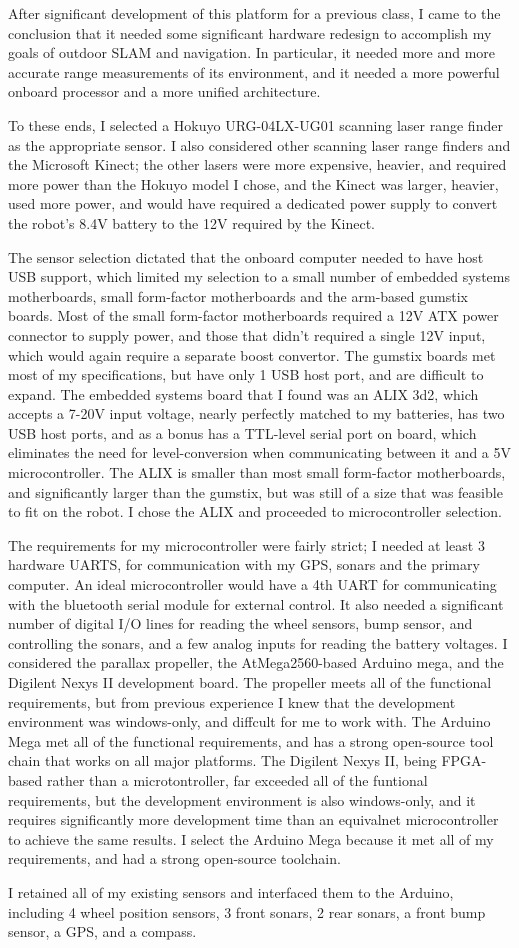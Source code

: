 
After significant development of this platform for a previous class, I came to the conclusion that it needed some significant hardware redesign to accomplish my goals of outdoor SLAM and navigation. In particular, it needed more and more accurate range measurements of its environment, and it needed a more powerful onboard processor and a more unified architecture.

To these ends, I selected a Hokuyo URG-04LX-UG01 scanning laser range finder as the appropriate sensor. I also considered other scanning laser range finders and the Microsoft Kinect; the other lasers were more expensive, heavier, and required more power than the Hokuyo model I chose, and the Kinect was larger, heavier, used more power, and would have required a dedicated power supply to convert the robot's 8.4V battery to the 12V required by the Kinect.

The sensor selection dictated that the onboard computer needed to have host USB support, which limited my selection to a small number of embedded systems motherboards, small form-factor motherboards and the arm-based gumstix boards. Most of the small form-factor motherboards required a 12V ATX power connector to supply power, and those that didn't required a single 12V input, which would again require a separate boost convertor. The gumstix boards met most of my specifications, but have only 1 USB host port, and are difficult to expand. The embedded systems board that I found was an ALIX 3d2, which accepts a 7-20V input voltage, nearly perfectly matched to my batteries, has two USB host ports, and as a bonus has a TTL-level serial port on board, which eliminates the need for level-conversion when communicating between it and a 5V microcontroller. The ALIX is smaller than most small form-factor motherboards, and significantly larger than the gumstix, but was still of a size that was feasible to fit on the robot. I chose the ALIX and proceeded to microcontroller selection.

The requirements for my microcontroller were fairly strict; I needed at least 3 hardware UARTS, for communication with my GPS, sonars and the primary computer. An ideal microcontroller would have a 4th UART for communicating with the bluetooth serial module for external control. It also needed a significant number of digital I/O lines for reading the wheel sensors, bump sensor, and controlling the sonars, and a few analog inputs for reading the battery voltages. I considered the parallax propeller, the AtMega2560-based Arduino mega, and the Digilent Nexys II development board. The propeller meets all of the functional requirements, but from previous experience I knew that the development environment was windows-only, and diffcult for me to work with. The Arduino Mega met all of the functional requirements, and has a strong open-source tool chain that works on all major platforms. The Digilent Nexys II, being FPGA-based rather than a microtontroller, far exceeded all of the funtional requirements, but the development environment is also windows-only, and it requires significantly more development time than an equivalnet microcontroller to achieve the same results. I select the Arduino Mega because it met all of my requirements, and had a strong open-source toolchain.

I retained all of my existing sensors and interfaced them to the Arduino, including 4 wheel position sensors, 3 front sonars, 2 rear sonars, a front bump sensor, a GPS, and a compass.
